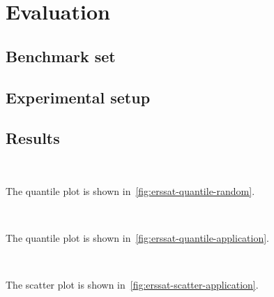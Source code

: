 \section{Evaluation}
\label{sect:erssat-evaluation}

\subsection{Benchmark set}

\subsection{Experimental setup}

\subsection{Results}

\begin{figure*}[ht]
    \centering
    \\
    \caption{Quantile plots of random $k$-CNF formulas}
    \label{fig:erssat-quantile-random}
\end{figure*}

The quantile plot is shown in~\cref{fig:erssat-quantile-random}.

\begin{figure*}[ht]
    \centering
    \\
    \caption{Quantile plots of application formulas}
    \label{fig:erssat-quantile-application}
\end{figure*}

The quantile plot is shown in~\cref{fig:erssat-quantile-application}.

\begin{figure*}[ht]
    \centering
    \subfloat[\erssatb]{
        
        \label{fig:erssat-scatter-cputime-application}
    }\\
    \subfloat[\dcssat]{
        
        \label{fig:dcssat-scatter-cputime-application}
    }
    \caption{CPU-time scatter plots of application formulas with \erssat in y-axis and compared approaches in x-axis}
    \label{fig:erssat-scatter-application}
\end{figure*}

The scatter plot is shown in~\cref{fig:erssat-scatter-application}.